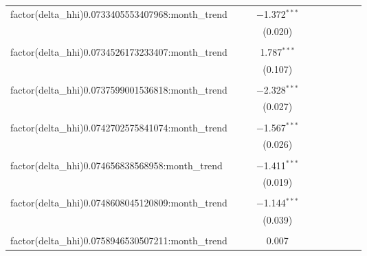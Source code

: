 \begin{table}[H]
{\begin{tabular}{@{\extracolsep{5pt}}lccccccccc}
  factor(delta\_hhi)0.0733405553407968:month\_trend &  &  & $-$1.372$^{***}$ &  &  &  &  &  &  \\  

   &  &  & (0.020) &  &  &  &  &  &  \\  

   & & & & & & & & & \\  

  factor(delta\_hhi)0.0734526173233407:month\_trend &  &  & 1.787$^{***}$ &  &  &  &  &  &  \\  

   &  &  & (0.107) &  &  &  &  &  &  \\  

   & & & & & & & & & \\  

  factor(delta\_hhi)0.0737599001536818:month\_trend &  &  & $-$2.328$^{***}$ &  &  &  &  &  &  \\  

   &  &  & (0.027) &  &  &  &  &  &  \\  

   & & & & & & & & & \\  

  factor(delta\_hhi)0.0742702575841074:month\_trend &  &  & $-$1.567$^{***}$ &  &  &  &  &  &  \\  

   &  &  & (0.026) &  &  &  &  &  &  \\  

   & & & & & & & & & \\  

  factor(delta\_hhi)0.074656838568958:month\_trend &  &  & $-$1.411$^{***}$ &  &  &  &  &  &  \\  

   &  &  & (0.019) &  &  &  &  &  &  \\  

   & & & & & & & & & \\  

  factor(delta\_hhi)0.0748608045120809:month\_trend &  &  & $-$1.144$^{***}$ &  &  &  &  &  &  \\  

   &  &  & (0.039) &  &  &  &  &  &  \\  

   & & & & & & & & & \\  

  factor(delta\_hhi)0.0758946530507211:month\_trend &  &  & 0.007 &  &  &  &  &  &  \\  


\end{tabular}}
\end{table}
